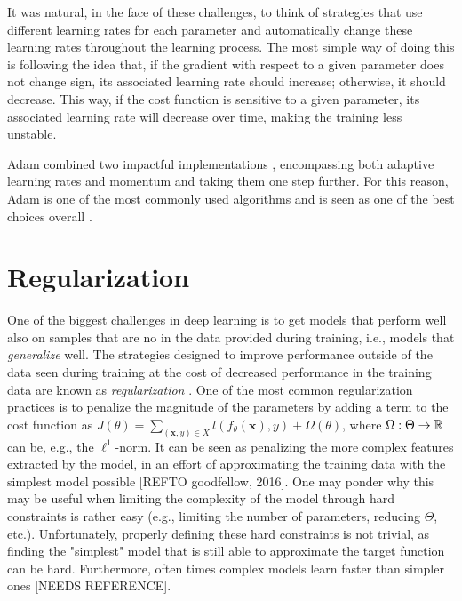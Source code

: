 It was natural, in the face of these challenges, to think of strategies that use different learning rates for each parameter and automatically change these learning rates throughout the learning process.
The most simple way of doing this is following the idea that, if the gradient with respect to a given parameter does not change sign, its associated learning rate should increase; otherwise, it should decrease.
This way, if the cost function is sensitive to a given parameter, its associated learning rate will decrease over time, making the training less unstable.

Adam\cite{kingma_adam_2015} combined two impactful implementations \cite{duchi_adaptive_2011,tieleman_lecture_2012}, encompassing both adaptive learning rates and momentum and taking them one step further.
For this reason, Adam is one of the most commonly used algorithms and is seen as one of the best choices overall \cite{ruder_overview_2017}.

\section{Regularization}

One of the biggest challenges in deep learning is to get models that perform well also on samples that are no in the data provided during training, i.e., models that \emph{generalize} well.
The strategies designed to improve performance outside of the data seen during training at the cost of decreased performance in the training data are known as \emph{regularization} \cite{goodfellow_deep_2016}.
One of the most common regularization practices is to penalize the magnitude of the parameters by adding a term to the cost function as $J\left( \theta \right) = \sum_{(\bm{x},y)\in X} l(f_\theta(\bm{x}), y) + \Omega\left( \theta \right) $, where $\Omega:\Theta\to\mathbb{R}$ can be, e.g., the $\ell^1$-norm.
It can be seen as penalizing the more complex features extracted by the model, in an effort of approximating the training data with the simplest model possible [REFTO goodfellow, 2016].
One may ponder why this may be useful when limiting the complexity of the model through hard constraints is rather easy (e.g., limiting the number of parameters, reducing $\Theta$, etc.).
Unfortunately, properly defining these hard constraints is not trivial, as finding the "simplest" model that is still able to approximate the target function can be hard.
Furthermore, often times complex models learn faster than simpler ones [NEEDS REFERENCE].

